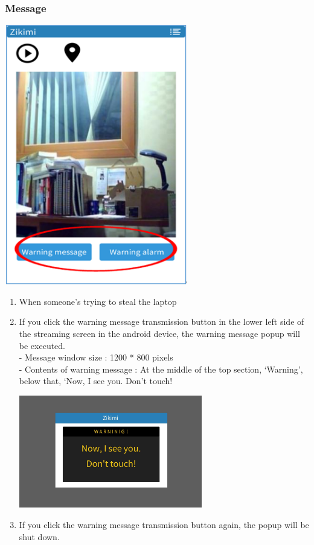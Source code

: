 \documentclass[12pt]{article}
\begin{document}
\subsubsection{Message}
\begin{center} 
\includegraphics[width=80mm,scale=1.2]{warning}
\end{center}
\begin{enumerate}
\item When someone’s trying to steal the laptop
\item If you click the warning message transmission button in the lower left side of the streaming screen in the android device, the warning message popup will be executed.\\
 - Message window size : 1200 * 800 pixels\\
 - Contents of warning message : At the middle of the top section, ‘Warning’, below that, ‘Now, I see you. Don’t touch!\\
\begin{center} 
\includegraphics[width=80mm,scale=1.2]{warningmessage}
\end{center}
\item If you click the warning message transmission button again, the popup will be shut down.
\end{enumerate}
\end{document}
